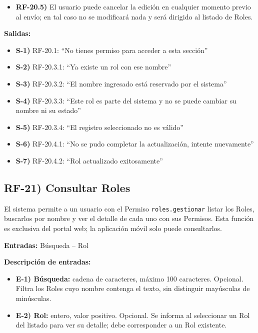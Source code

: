 \begin{itemize}[label={}, leftmargin=1.5em]
  \begin{itemize}[label={}, leftmargin=1.5em]
    \item \textbf{RF-20.4.1)} Si la operaci\'on falla, no se modificar\'a nada (rollback) y se notificar\'a: ``No se pudo completar la actualizaci\'on, intente nuevamente''.
    \item \textbf{RF-20.4.2)} Si se completa, se desplegar\'a el mensaje: ``Rol actualizado exitosamente'' y el usuario ser\'a dirigido al listado de Roles (RF-21).
  \end{itemize}
  \item \textbf{RF-20.5)} El usuario puede cancelar la edici\'on en cualquier momento previo al env\'io; en tal caso no se modificar\'a nada y ser\'a dirigido al listado de Roles.
\end{itemize}

\textbf{Salidas:}
\begin{itemize}[label={}, leftmargin=1.5em]
  \item \textbf{S-1)} RF-20.1: ``No tienes permiso para acceder a esta secci\'on''
  \item \textbf{S-2)} RF-20.3.1: ``Ya existe un rol con ese nombre''
  \item \textbf{S-3)} RF-20.3.2: ``El nombre ingresado est\'a reservado por el sistema''
  \item \textbf{S-4)} RF-20.3.3: ``Este rol es parte del sistema y no se puede cambiar su nombre ni su estado''
  \item \textbf{S-5)} RF-20.3.4: ``El registro seleccionado no es v\'alido''
  \item \textbf{S-6)} RF-20.4.1: ``No se pudo completar la actualizaci\'on, intente nuevamente''
  \item \textbf{S-7)} RF-20.4.2: ``Rol actualizado exitosamente''
\end{itemize}

\subsection*{RF-21) Consultar Roles}
El sistema permite a un usuario con el Permiso \texttt{roles.gestionar} listar los Roles, buscarlos por nombre y ver el detalle de cada uno con sus Permisos. Esta funci\'on es exclusiva del portal web; la aplicaci\'on m\'ovil solo puede consultarlos.

\textbf{Entradas:} B\'usqueda -- Rol

\textbf{Descripci\'on de entradas:}
\begin{itemize}[label={}, leftmargin=1.5em]
  \item \textbf{E-1) B\'usqueda:} cadena de caracteres, m\'aximo 100 caracteres. Opcional. Filtra los Roles cuyo nombre contenga el texto, sin distinguir may\'usculas de min\'usculas.
  \item \textbf{E-2) Rol:} entero, valor positivo. Opcional. Se informa al seleccionar un Rol del listado para ver su detalle; debe corresponder a un Rol existente.
\end{itemize}

